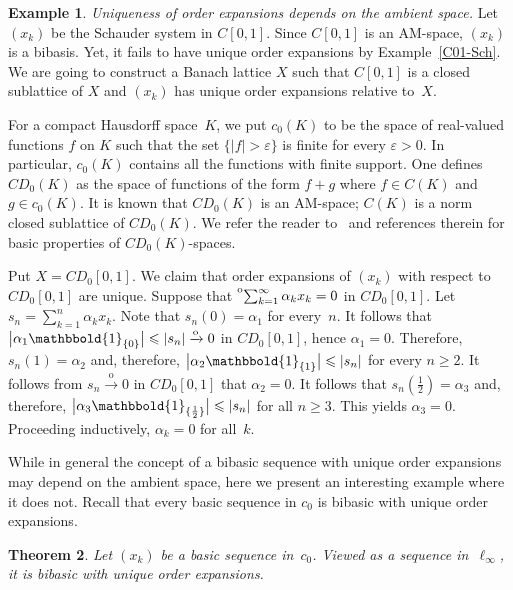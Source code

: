 \documentclass[12pt]{amsart}
\theoremstyle{plain}
\newtheorem{theorem}{Theorem}[section]
\theoremstyle{definition}
\newtheorem{example}[theorem]{Example}
\newcommand{\abs}[1]{\lvert#1\rvert}
\newcommand{\bigabs}[1]{\bigl\lvert#1\bigr\rvert}
\newcommand{\goeso}{\xrightarrow{\mathrm{o}}}	%
\newcommand{\tos}{\prescript{{\rm o}}{}{\sum_{k=1}^\infty\,}}
\def\one{\mathbbold{1}}
\renewcommand{\le}{\leqslant}
\renewcommand{\ge}{\geqslant}
\begin{document}
\begin{example}
  \emph{Uniqueness of order expansions depends on the ambient space.}
  Let $(x_k)$ be the Schauder system in $C[0,1]$. Since $C[0,1]$ is an
  AM-space, $(x_k)$ is a bibasis.  Yet, it fails to have unique order
  expansions by Example~\ref{C01-Sch}. We are going to construct a
  Banach lattice $X$ such that $C[0,1]$ is a closed sublattice of $X$
  and $(x_k)$ has unique order expansions relative to~$X$.

  For a compact Hausdorff space~$K$, we put $c_0(K)$ to be the space of
  real-valued functions $f$ on $K$ such that the set
  $\bigl\{\abs{f}>\varepsilon\bigr\}$ is finite for every
  $\varepsilon>0$. In particular, $c_0(K)$ contains all the functions
  with finite support. One defines $CD_0(K)$ as the space of
  functions of the form $f+g$ where $f\in C(K)$ and $g\in c_0(K)$. It
  is known that $CD_0(K)$ is an AM-space; $C(K)$ is a norm closed
  sublattice of $CD_0(K)$. We refer the reader
  to~\cite{Abramovich:93,Troitsky:04} and references therein for basic
  properties of $CD_0(K)$-spaces.
 
  Put $X=CD_0[0,1]$.  We claim that order expansions of $(x_k)$ 
  with respect to $CD_0[0,1]$ are unique. Suppose that $\tos\alpha_kx_k=0$
  in $CD_0[0,1]$. Let $s_n=\sum_{k=1}^n\alpha_kx_k$. Note that
  $s_n(0)=\alpha_1$ for every~$n$. It follows that
  $\bigabs{\alpha_1\one_{\{0\}}}\le\abs{s_n}\goeso 0$ in $CD_0[0,1]$,
  hence $\alpha_1=0$. Therefore, $s_n(1)=\alpha_2$ and, therefore,
  $\bigabs{\alpha_2\one_{\{1\}}}\le\abs{s_n}$ for every $n\ge 2$. It
  follows from $s_n\goeso 0$ in $CD_0[0,1]$ that $\alpha_2=0$. It
  follows that $s_n(\frac12)=\alpha_3$ and, therefore,
  $\bigabs{\alpha_3\one_{\{\frac12\}}}\le\abs{s_n}$ for all $n\ge
  3$. This yields $\alpha_3=0$. Proceeding inductively, $\alpha_k=0$
  for all~$k$.
\end{example}


While in general the concept of a bibasic sequence with unique order
expansions may depend on the ambient space, here we present an
interesting example where it does not. Recall that every basic
sequence in $c_0$ is bibasic with unique order expansions.

\begin{theorem}
  Let $(x_k)$ be a basic sequence in~$c_0$. Viewed as a sequence
  in~$\ell_\infty$, it is bibasic with unique order expansions.
\end{theorem}
\end{document}

